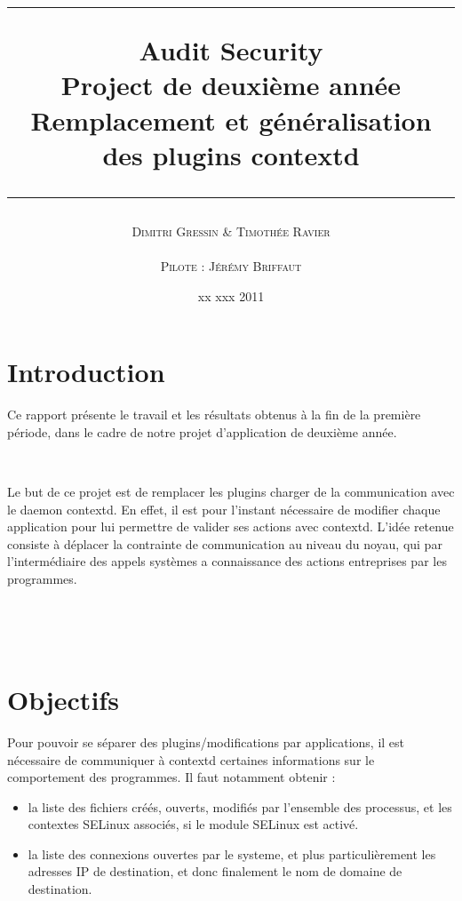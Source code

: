 \documentclass[pdftex,a4paper,titlepage,11pt,openright]{article}
\newcommand{\nom}[1]{\textsc{#1}}
\newcommand{\ligne}[1][1pt]{
  \par\noindent
  \rule[.5ex]{\linewidth}{#1}\par}
\newcommand{\clearemptydoublepage}{
	\newpage{\pagestyle{empty}\cleardoublepage}}
\begin{document}
\setlength{\parskip}{2.4ex}

\title{
\ligne{\Large}
\textbf{Audit Security}\\
\textbf{Project de deuxième année}\\
\Large Remplacement et généralisation des plugins contextd
\ligne{\Large}
}
\author{\nom{Dimitri Gressin} \& \nom{Timothée Ravier}\\\\\nom{Pilote : Jérémy Briffaut}}
\date{xx xxx 2011} %

\maketitle

\clearemptydoublepage

\setcounter{secnumdepth}{2}
\setcounter{tocdepth}{2}
\tableofcontents
\addtocounter{page}{-1}

\newpage

\section*{Introduction} 
Ce rapport présente le travail et les résultats obtenus à la fin de la première période, dans le cadre de notre projet d'application de deuxième année.

~

Le but de ce projet est de remplacer les plugins charger de la communication avec le daemon contextd. En effet, il est pour l'instant nécessaire de modifier chaque application pour lui permettre de valider ses actions avec contextd. L'idée retenue consiste à déplacer la contrainte de communication au niveau du noyau, qui par l'intermédiaire des appels systèmes a connaissance des actions entreprises par les programmes.

~


~


\newpage

\section{Objectifs}

Pour pouvoir se séparer des plugins/modifications par applications, il est nécessaire de communiquer à contextd certaines informations sur le comportement des programmes. Il faut notamment obtenir :
\begin{itemize}
	\item la liste des fichiers créés, ouverts, modifiés par l'ensemble des processus, et les contextes SELinux associés, si le module SELinux est activé.
	\item la liste des connexions ouvertes par le systeme, et plus particulièrement les adresses IP de destination, et donc finalement le nom de domaine de destination.\\
\end{itemize}
\end{document}
